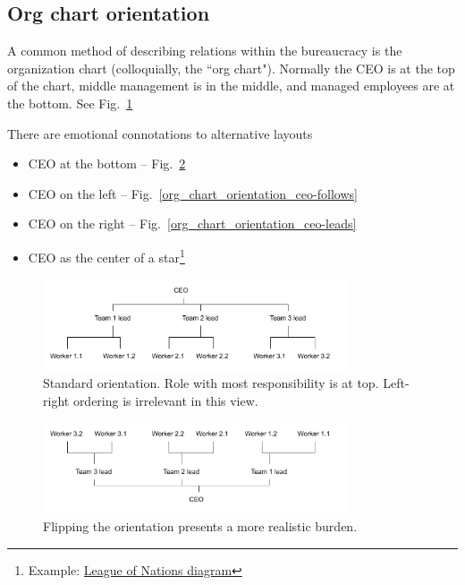 \subsection{Org chart orientation
\label{org-chart-orientation}}
A common method of describing relations within the bureaucracy is the organization chart (colloquially, the ``org chart"). Normally the CEO is at the top of the chart, middle management is in the middle, and managed employees are at the bottom. See Fig.~\ref{org_chart_orientation_ceo-at-top} 

There are emotional connotations to alternative layouts
\begin{itemize}
\item CEO at the bottom -- Fig.~\ref{org_chart_orientation_ceo-at-bottom}
\item CEO on the left -- Fig.~\ref{org_chart_orientation_ceo-follows}
\item CEO on the right -- Fig.~\ref{org_chart_orientation_ceo-leads}
\item CEO as the center of a star\footnote{Example: \href{https://en.wikipedia.org/wiki/File:League_of_Nations_Organization.png}{League of Nations diagram}}
\end{itemize}


\begin{figure}
\includegraphics[width=0.8\textwidth]{images/org-chart-orientation-ceo-at-top.pdf}
\caption{Standard orientation. Role with most responsibility is at top. Left-right ordering is irrelevant in this view.}
\label{org_chart_orientation_ceo-at-top}
\end{figure}

\begin{figure}
\includegraphics[width=0.8\textwidth]{images/org-chart-orientation-ceo-at-bottom.pdf}
\caption{Flipping the orientation presents a more realistic burden.}
\label{org_chart_orientation_ceo-at-bottom}
\end{figure}

